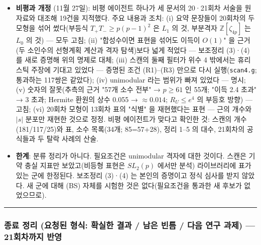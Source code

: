 \begin{itemize}
  \textbf{조건의 무게에 대한 관찰}: \(p\equiv1\bmod4\) 이고 \((p+1)/2\) 가 소수인 \(p\) 는 2000 미만에 34개다(5, 13, 37, 61, 73, 157, 193, 277, 313, 397, \ldots). 무한히 많다는 것은 미해결이지만 Hardy--Littlewood 형의 표준 추측이 예측한다(\(x/\log^2x\) 규모). 따라서 조건이 "강하다" 는 것은 증명되지 않았다는 뜻이지 드물다는 뜻이 아니며, 실제 병목은 안정성 (BS) 의 증명이다. 또 지금까지의 계산과 20회차의 모형이 \(p\equiv5\bmod8\) 만 다룬 것은 계산상의 제한이고, 필요조건은 \(p\equiv1\bmod8\) (73, 193, 313, \ldots)에서도 통과한다(이들은 아직 시험하지 못했다).
\item
  \textbf{비평과 개정} (11월 27일): 비평 에이전트 하나가 세 문서의 20·21회차 서술을 원자료와 대조해 19건을 지적했다. 주요 내용과 조치: (i) 요약 문장들이 20회차의 두 모형을 섞어 썼다(부등식 \(T_+T_-\ge p(p-1)^2\) 은 \(L_1\) 의 것, 부분격자 \(\mathbb Z[\zeta_{4p}]\) 는 \(L_0\) 의 것) --- 모두 고침; (ii) "합성수이면 표현을 섞어도 이득이 \(O(1)\)" 을 근거(두 소인수의 선형계획 계산과 격자 탐색)보다 넓게 적었다 --- 보조정리 (3)·(4) 를 새로 증명해 위의 명제로 대체; (iii) 스캔의 둘째 필터가 위수 4 밖에서는 휴리스틱 주장에 기대고 있었다 --- 증명된 조건 (R1)--(R3) 만으로 다시 실행(\texttt{scan4.g}; 통과하는 117쌍은 같았다); (iv) unimodular 라는 범위가 빠져 있었다 --- 명시; (v) 숫자의 잘못(추측의 근거 "57개 소수 전부" → \(p\ge61\) 인 55개; "이득 2.4 초과" → 3 초과; Hermite 환원의 상수 0.055 → \(\approx0.014\); \(R_U\le e^4\) 의 부등호 방향) --- 고침; (vi) 20회차 모형이 13회차 표의 "식별" 을 재현했다는 표현 --- 근의 개수와 \(|s|\) 분포만 재현한 것으로 정정. 비평 에이전트가 맞다고 확인한 것: 스캔의 개수(181/117/25)와 표, 소수 목록(34개; 85=57+28), 정리 1--5 의 대수, 21회차의 공식들과 두 탈락 사례의 산술.
\item
  \textbf{한계}: 분류 정리가 아니다. 필요조건은 unimodular 격자에 대한 것이다. 스캔은 기약 충실 지표만 보았고(비등형 표현은 \(SL_2(p)\) 에서만 분석) 라이브러리에 표가 있는 군에 한정된다. 보조정리 (3)·(4) 는 본인의 증명이고 정식 심사를 받지 않았다. 새 군에 대해 (BS) 자체를 시험한 것은 없다(필요조건을 통과한 새 후보가 없었으므로).
\end{itemize}

\begin{center}\rule{0.5\linewidth}{0.5pt}\end{center}

\hypertarget{uxc885uxb8cc-uxc815uxb9ac-uxc694uxccaduxb41c-uxd615uxc2dd-uxd655uxc2e4uxd55c-uxacb0uxacfc-uxb0a8uxc740-uxbe48uxd2c8-uxb2e4uxc74c-uxc5f0uxad6c-uxacfcuxc81c-21uxd68cuxcc28uxae4cuxc9c0-uxbc18uxc601}{%
\subsubsection*{종료 정리 (요청된 형식: 확실한 결과 / 남은 빈틈 / 다음 연구 과제) --- 21회차까지 반영}\label{uxc885uxb8cc-uxc815uxb9ac-uxc694uxccaduxb41c-uxd615uxc2dd-uxd655uxc2e4uxd55c-uxacb0uxacfc-uxb0a8uxc740-uxbe48uxd2c8-uxb2e4uxc74c-uxc5f0uxad6c-uxacfcuxc81c-21uxd68cuxcc28uxae4cuxc9c0-uxbc18uxc601}}

